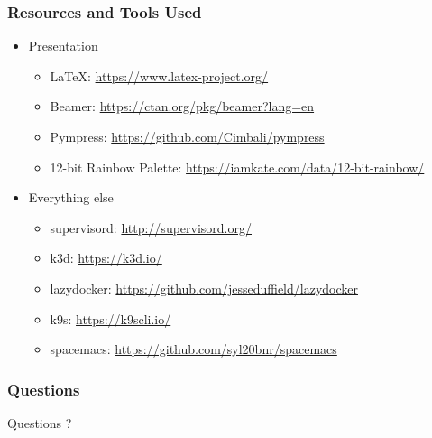     \begin{frame}
      \frametitle{Resources and Tools Used}
      \begin{itemize}
      \item Presentation
        \begin{itemize}
        \item \LaTeX:
          \href{https://www.latex-project.org/}{https://www.latex-project.org/}
        \item Beamer:
          \href{https://ctan.org/pkg/beamer?lang=en}{https://ctan.org/pkg/beamer?lang=en}
        \item Pympress:
          \href{https://github.com/Cimbali/pympress}{https://github.com/Cimbali/pympress}
        \item 12-bit Rainbow Palette:
          \href{https://iamkate.com/data/12-bit-rainbow/}{https://iamkate.com/data/12-bit-rainbow/}
        \end{itemize}
      \item Everything else
        \begin{itemize}
        \item supervisord:
          \href{http://supervisord.org/}{http://supervisord.org/}
        \item k3d:
          \href{https://k3d.io/}{https://k3d.io/}
        \item lazydocker:
          \href{https://github.com/jesseduffield/lazydocker}{https://github.com/jesseduffield/lazydocker}
        \item k9s:
          \href{https://k9scli.io/}{https://k9scli.io/}
        \item spacemacs:
          \href{https://github.com/syl20bnr/spacemacs}{https://github.com/syl20bnr/spacemacs}
        \end{itemize}
      \end{itemize}
    \end{frame}

    \begin{frame}
      \frametitle{Questions}
      \begin{center}
        {\Huge Questions ?}
      \end{center}
    \end{frame}


